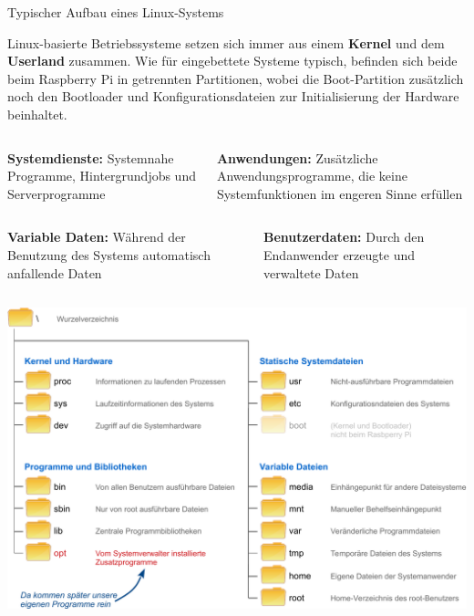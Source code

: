 {\begin{frame}[allowframebreaks]{Typischer Aufbau eines Linux-Systems}
    \parbox{\linewidth}{
        Linux-basierte Betriebssysteme setzen sich immer aus einem \textbf{Kernel}
        und dem \textbf{Userland} zusammen. Wie für eingebettete Systeme typisch,
        befinden sich beide beim Raspberry Pi in getrennten Partitionen, wobei die
        Boot-Partition zusätzlich noch den Bootloader und Konfigurationsdateien zur
        Initialisierung der Hardware beinhaltet.
    }

    {
        \bigskip
        \scriptsize

        \begin{columns}[T, onlytextwidth]
            \parbox{\linewidth}{
                \textbf{Systemdienste:} Systemnahe Programme, Hintergrundjobs und
                Serverprogramme
            }

            \parbox{\linewidth}{
                \textbf{Anwendungen:} Zusätzliche Anwendungsprogramme, die keine
                Systemfunktionen im engeren Sinne erfüllen
            }
        \end{columns}

        \medskip

        \begin{columns}[T, onlytextwidth]
            \parbox{\linewidth}{
                \textbf{Variable Daten:} Während der Benutzung des Systems automatisch
                anfallende Daten
            }

            \parbox{\linewidth}{
                \textbf{Benutzerdaten:} Durch den Endanwender erzeugte und verwaltete
                Daten
            }
        \end{columns}
    }

    \framebreak
    \includegraphics[width=\textwidth]{8-linux/img/fhs-verzeichnisse}
\end{frame}
}


